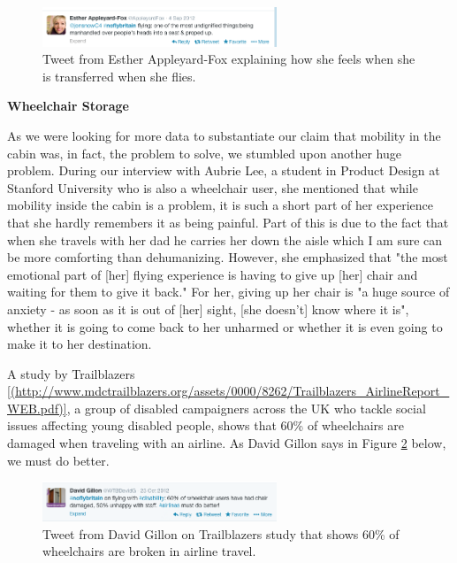 \begin{figure}[h]
  \centering
     \includegraphics[width=7cm]{images/MobilityTweet.png}
   \caption{Tweet from Esther Appleyard-Fox explaining how she feels when she is transferred when she flies. }
  \label{fig:MobilityTweet.png}
\end{figure}


\textbf{Wheelchair Storage}

As we were looking for more data to substantiate our claim that mobility in the cabin was, in fact, the problem to solve, we stumbled upon another huge problem. During our interview with Aubrie Lee, a student in Product Design at Stanford University who is also a wheelchair user, she mentioned that while mobility inside the cabin is a problem, it is such a short part of her experience that she hardly remembers it as being painful. Part of this is due to the fact that when she travels with her dad he carries her down the aisle which I am sure can be more comforting than dehumanizing. However, she emphasized that "the most emotional part of [her] flying experience is having to give up [her] chair and waiting for them to give it back." For her, giving up her chair is "a huge source of anxiety - as soon as it is out of [her] sight, [she doesn't] know where it is", whether it is going to come back to her unharmed or whether it is even going to make it to her destination. 

A study by Trailblazers \ref{(http://www.mdctrailblazers.org/assets/0000/8262/Trailblazers_AirlineReport_WEB.pdf)}, a group of disabled campaigners across the UK who tackle social issues affecting young disabled people, shows that 60\% of wheelchairs are damaged when traveling with an airline. As David Gillon says in Figure \ref{fig:60percenttweet.png} below, we must do better. 


\begin{figure}[h]
  \centering
     \includegraphics[width=7cm]{images/60percenttweet.png}
   \caption{Tweet from David Gillon on Trailblazers study that shows 60\% of wheelchairs are broken in airline travel. }
  \label{fig:60percenttweet.png}
\end{figure}

